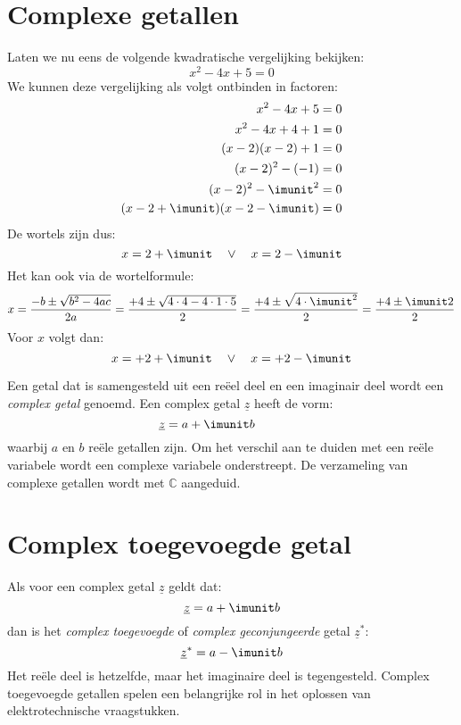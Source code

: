 \section{Complexe getallen}
Laten we nu eens de volgende kwadratische vergelijking bekijken:
%
\begin{equation}
x^2 - 4x + 5 = 0
\end{equation}
%
We kunnen deze vergelijking als volgt ontbinden in factoren:
%
\begin{equation}
\begin{split}
x^2 - 4x + 5 = 0 \\
x^2 - 4x + 4 + 1 = 0 \\
(x-2)(x-2) + 1 = 0 \\
(x-2)^2 - (-1) = 0 \\
(x-2)^2  - \imunit^2 = 0 \\
(x-2+\imunit)(x-2-\imunit) = 0 \\
\end{split}
\end{equation}
%
De wortels zijn dus:
%
\begin{equation}
x=2+\imunit \quad\vee\quad x=2-\imunit
\end{equation}
%
Het kan ook via de wortelformule:
%
\begin{equation}
x = \dfrac{-b\pm\sqrt{b^2-4ac}}{2a} = \dfrac{+4\pm\sqrt{4\cdot4-4\cdot1\cdot5}}{2} = \dfrac{+4\pm\sqrt{4\cdot\imunit^2}}{2} = \dfrac{+4\pm\imunit2}{2} \\
\end{equation}
%
Voor $x$ volgt dan:
%
\begin{equation}
x = +2+\imunit \quad\vee\quad x = +2-\imunit
\end{equation}

Een getal dat is samengesteld uit een reëel deel en een imaginair deel wordt een \textsl{complex getal} genoemd. Een complex getal $\underline{z}$ heeft de vorm:
%
\begin{equation}
\underline{z} = a +\imunit b \qquad\qquad %
\end{equation}
%
waarbij $a$ en $b$ reële getallen zijn. Om het verschil aan te duiden met een reële variabele wordt een complexe variabele onderstreept. De verzameling van complexe getallen wordt met $\mathbb{C}$ aangeduid.


\section{Complex toegevoegde getal}
Als voor een complex getal $\underline{z}$ geldt dat:
%
\begin{equation}
\underline{z} = a + \imunit b
\end{equation}
%
dan is het \textsl{complex toegevoegde} of \textsl{complex geconjungeerde} getal $\underline{z}^*$:
%
\begin{equation}
\underline{z}^* = a - \imunit b
\end{equation}
%
Het reële deel is hetzelfde, maar het imaginaire deel is tegengesteld. Complex toegevoegde getallen spelen een belangrijke rol in het oplossen van elektrotechnische vraagstukken.


